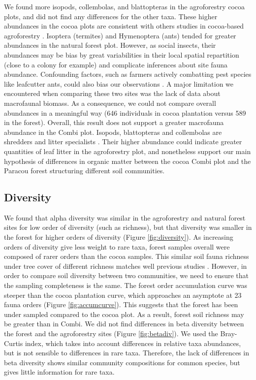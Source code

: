 \documentclass[fleqn,10pt]{ArtEcoFoG} %
\begin{document}
We found more isopods, collembolas, and blattopteras in the agroforestry cocoa plots, and did not find any differences for the other taxa. These higher abundances in the cocoa plots are consistent with others studies in cocoa-based agroforestry \citep{da_silva_moco_soil_2009, rousseau_shade_2021}. Isoptera (termites) and Hymenoptera (ants) tended for greater abundances in the natural forest plot. However, as social insects, their abundances may be bias by great variabilities in their local spatial repartition (close to a colony for example) and complicate inferences about site fauna abundance. Confounding factors, such as farmers actively combatting pest species like leafcutter ants, could also bias our observations \citep{saj_projetc2g2_2023}. A major limitation we encountered when comparing these two sites was the lack of data about macrofaunal biomass. As a consequence, we could not compare overall abundances in a meaningful way (646 individuals in cocoa plantation versus 589 in the forest). Overall, this result does not support a greater macrofauna abundance in the Combi plot. Isopods, blattopteras and collembolas are shredders and litter specialists \citep{da_silva_moco_soil_2009, levings_litter_1985, packham_functional_1992}. Their higher abundance could indicate greater quantities of leaf litter in the agroforestry plot, and nonetheless support our main hypothesis of differences in organic matter between the cocoa Combi plot and the Paracou forest structuring different soil communities.

\subsection{Diversity}\label{diversity}

We found that alpha diversity was similar in the agroforestry and natural forest sites for low order of diversity (such as richness), but that diversity was smaller in the forest for higher orders of diversity (Figure \ref{fig:diversity}). As increasing orders of diversity give less weight to rare taxa, forest samples overall were composed of rarer orders than the cocoa samples. This similar soil fauna richness under tree cover of different richness matches well previous studies \citep{korboulewsky_how_2016, rousseau_shade_2021}. However, in order to compare soil diversity between two communities, we need to ensure that the sampling completeness is the same. The forest order accumulation curve was steeper than the cocoa plantation curve, which approaches an asymptote at 23 fauna orders (Figure \ref{fig:accumcurve}). This suggests that the forest has been under sampled compared to the cocoa plot. As a result, forest soil richness may be greater than in Combi. We did not find differences in beta diversity between the forest and the agroforestry sites (Figure \ref{fig:betadiv}). We used the Bray-Curtis index, which takes into account differences in relative taxa abundances, but is not sensible to differences in rare taxa. Therefore, the lack of differences in beta diversity shows similar community compositions for common species, but gives little information for rare taxa.
\end{document}
